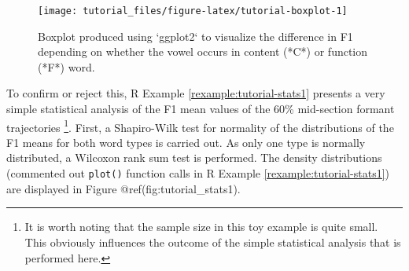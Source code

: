 \documentclass[]{book}
\newenvironment{Shaded}{\begin{snugshade}}{\end{snugshade}}
\newcommand{\CommentTok}[1]{\textcolor[rgb]{0.56,0.35,0.01}{\textit{#1}}}
\newcommand{\DataTypeTok}[1]{\textcolor[rgb]{0.13,0.29,0.53}{#1}}
\newcommand{\DecValTok}[1]{\textcolor[rgb]{0.00,0.00,0.81}{#1}}
\newcommand{\KeywordTok}[1]{\textcolor[rgb]{0.13,0.29,0.53}{\textbf{#1}}}
\newcommand{\NormalTok}[1]{#1}
\newcommand{\OperatorTok}[1]{\textcolor[rgb]{0.81,0.36,0.00}{\textbf{#1}}}
\newcommand{\StringTok}[1]{\textcolor[rgb]{0.31,0.60,0.02}{#1}}
\let\rmarkdownfootnote\footnote%
\def\footnote{\protect\rmarkdownfootnote}
\theoremstyle{definition}
\theoremstyle{definition}
\theoremstyle{definition}
\theoremstyle{remark}
\begin{document}
\begin{Shaded}
\end{Shaded}

\begin{figure}

{\centering \texttt{[image: tutorial\_files/figure-latex/tutorial-boxplot-1]} 

}

\caption{Boxplot produced using `ggplot2` to visualize the difference in F1 depending on whether the vowel occurs in content (*C*) or function (*F*) word.}\label{fig:tutorial-boxplot}
\end{figure}

To confirm or reject this, R Example \ref{rexample:tutorial-stats1}
presents a very simple statistical analysis of the F1 mean values of the
60\% mid-section formant trajectories \footnote{It is worth noting that
  the sample size in this toy example is quite small. This obviously
  influences the outcome of the simple statistical analysis that is
  performed here.}. First, a Shapiro-Wilk test for normality of the
distributions of the F1 means for both word types is carried out. As
only one type is normally distributed, a Wilcoxon rank sum test is
performed. The density distributions (commented out \texttt{plot()}
function calls in R Example \ref{rexample:tutorial-stats1}) are
displayed in Figure @ref(fig:tutorial\_stats1).
\end{document}
